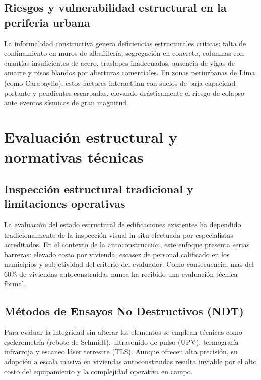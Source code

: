 \documentclass[12pt,oneside]{report}
\begin{document}
\subsection{Riesgos y vulnerabilidad estructural en la periferia urbana}
La informalidad constructiva genera deficiencias estructurales críticas: falta de confinamiento en muros de albañilería, segregación en concreto, columnas con cuantías insuficientes de acero, traslapes inadecuados, ausencia de vigas de amarre y pisos blandos por aberturas comerciales. En zonas periurbanas de Lima (como Carabayllo), estos factores interactúan con suelos de baja capacidad portante y pendientes escarpadas, elevando drásticamente el riesgo de colapso ante eventos sísmicos de gran magnitud.\par

\section{Evaluación estructural y normativas técnicas}

\subsection{Inspección estructural tradicional y limitaciones operativas}
La evaluación del estado estructural de edificaciones existentes ha dependido tradicionalmente de la inspección visual in situ efectuada por especialistas acreditados. En el contexto de la autoconstrucción, este enfoque presenta serias barreras: elevado costo por vivienda, escasez de personal calificado en los municipios y subjetividad del criterio del evaluador. Como consecuencia, más del 60\% de viviendas autoconstruidas nunca ha recibido una evaluación técnica formal.\par

\subsection{Métodos de Ensayos No Destructivos (NDT)}
Para evaluar la integridad sin alterar los elementos se emplean técnicas como esclerometría (rebote de Schmidt), ultrasonido de pulso (UPV), termografía infrarroja y escaneo láser terrestre (TLS). Aunque ofrecen alta precisión, su adopción a escala masiva en viviendas autoconstruidas resulta inviable por el alto costo del equipamiento y la complejidad operativa en campo.\par
\end{document}

